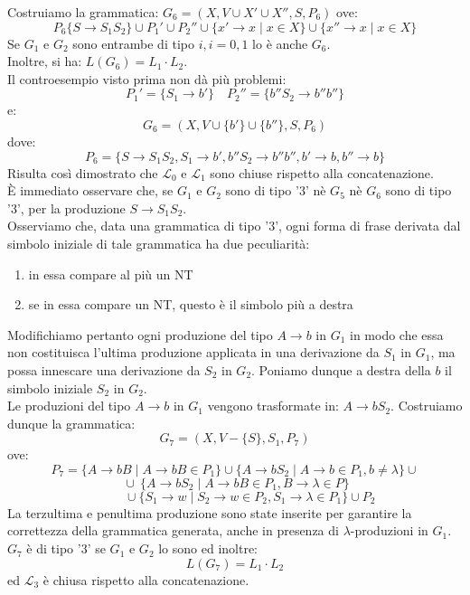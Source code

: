 \documentclass[12pt]{report}
\begin{document}
{{{\begin{enumerate}
			Costruiamo la grammatica: $G_6 = (X, V \cup X'\cup X'', S, P_6)$ ove:
			\[
			P_6 \{S \to S_1S_2\} \cup P_1'\cup P_2'' \cup \{x'\to x \mid x \in X\} \cup \{x'' \to x \mid x \in X\}
			\]
			Se $G_1$ e $G_2$ sono entrambe di tipo $i, i=0,1$ lo è anche $G_6$. \\
			Inoltre, si ha: $L(G_6) = L_1 \cdot L_2$. \\
			Il controesempio visto prima non dà più problemi:
			\[
			P_1' = \{S_1 \to b' \} \quad P_2'' = \{b''S_2 \to b''b''\}
			\]
			e:
			\[
			G_6 = (X, V \cup \{b'\} \cup \{b'' \}, S, P_6)
			\]
			dove:
			\[
			P_6 = \{S \to S_1S_2, S_1 \to b', b''S_2 \to b''b'', b' \to b, b'' \to b\}
			\]
			Risulta così dimostrato che $\mathcal{L}_0$ e $\mathcal{L}_1$ sono chiuse rispetto alla concatenazione. \\
			È immediato osservare che, se $G_1$ e $G_2$ sono di tipo '3' nè $G_5$ nè $G_6$ sono di tipo '3', per la produzione $S \to S_1S_2$. \\
			Osserviamo che, data una grammatica di tipo '3', ogni forma di frase derivata dal simbolo iniziale di tale grammatica ha due peculiarità:
			\begin{enumerate}[(1)]
				\item in essa compare al più un NT
				\item se in essa compare un NT, questo è il simbolo più a destra
			\end{enumerate}
			Modifichiamo pertanto ogni produzione del tipo $A \to b$ in $G_1$ in modo che essa non costituisca l'ultima produzione applicata in una derivazione da $S_1$ in $G_1$, ma possa innescare una derivazione da $S_2$ in $G_2$. Poniamo dunque a destra della $b$ il simbolo iniziale $S_2$ in $G_2$. \\
			Le produzioni del tipo $A \to b$ in $G_1$ vengono trasformate in: $A \to bS_2$. Costruiamo dunque la grammatica:
			\[
			G_7 = (X, V - \{S\}, S_1, P_7)
			\]
			ove:
			\[P_7 = \{A \to bB \mid A \to bB \in P_1\} \cup \{A\to bS_2 \mid A \to b \in  P_1, b \neq \lambda\} \cup \]
			\[\ \cup\ \{ A \to bS_2 \mid A \to bB \in  P_1, B \to \lambda \in P\}\]
			\[\phantom{P_7 =} \cup \{ S_1 \to w \mid S_2 \to w \in P_2, S_1 \to \lambda\in P_1\} \cup P_2\]
			La terzultima e penultima produzione sono state inserite per garantire la correttezza della grammatica generata, anche in presenza di $\lambda$-produzioni in $G_1$. \\
			$G_7$ è di tipo '3' se $G_1$ e $G_2$ lo sono ed inoltre:
			\[
			L(G_7) = L_1 \cdot L_2
			\]
			ed $\mathcal{L}_3$ è chiusa rispetto alla concatenazione.

\end{enumerate}}}}
\end{document}
